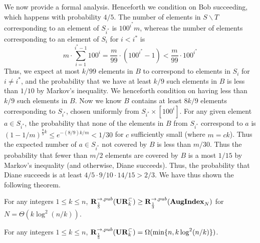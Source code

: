 We now provide a formal analysis. Henceforth we condition on Bob succeeding, which happens with probability $4/5$. The number of elements in $S\backslash T$ corresponding to an element of $S_{i^*}$ is $100^{i^*} m$, whereas the number of elements corresponding to an element of $S_i$ for $i < i^*$ is
$$
m\cdot \sum_{i=1}^{i^*-1} 100^i = \frac m{99}\cdot (100^{i^*} - 1) < \frac m{99}\cdot 100^{i^*}
$$
Thus, we expect at most $k/99$ elements in $B$ to correspond to elements in $S_i$ for $i\neq i^*$, and the probability that we have at least $k/9$ such elements in $B$ is less than $1/10$ by Markov's inequality. We henceforth condition on having less than $k/9$ such elements in $B$. Now we know $B$ contains at least $8k/9$ elements corresponding to $S_{i^*}$, chosen uniformly from $S_{i^*}\times [100^i]$. For any given element $a\in S_{i^*}$, the probability that none of the elements in $B$ from $S_{i^*}$ correspond to $a$ is $(1 - 1/m)^{\frac 89 k} \le e^{-(8/9)k/m} < 1/30$ for $c$ sufficiently small (where $m = ck$). Thus the expected number of $a\in S_{i^*}$ not covered by $B$ is less than $m/30$. Thus the probability that fewer than $m/2$ elements are covered by $B$ is a most $1/15$ by Markov's inequality (and otherwise, Diane succeeds). Thus, the probability that Diane succeeds is at least $4/5\cdot 9/10 \cdot 14/15 > 2/3$. We have thus shown the following theorem.

\begin{theorem}
For any integers $1\le k \le n$, $\mathbf{R}^{\rightarrow,pub}_{\frac 15}(\mathbf{UR}_k^\subset) \ge \mathbf{R}^{\rightarrow,pub}_{\frac 13}(\mathbf{AugIndex}_N)$ for $N = \Theta(k\log^2(n/k))$.
\end{theorem}

\begin{corollary}
For any integers $1\le k \le n$, $\mathbf{R}^{\rightarrow,pub}_{\frac 15}(\mathbf{UR}_k^\subset) = \Omega(\min\{n, k\log^2(n/k)\})$.
\end{corollary}


